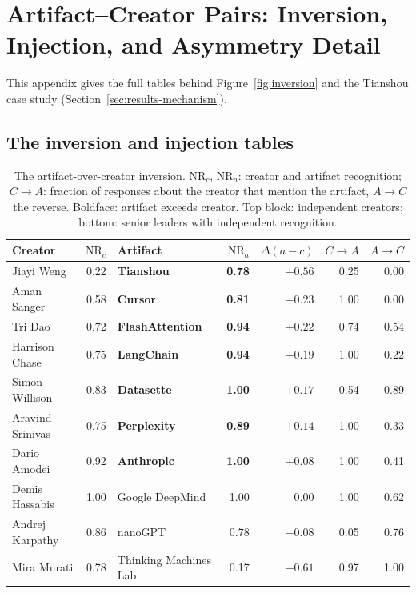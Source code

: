 \section{Artifact--Creator Pairs: Inversion, Injection, and Asymmetry Detail}
\label{app:asymmetry}

This appendix gives the full tables behind Figure~\ref{fig:inversion} and the Tianshou case study (Section~\ref{sec:results-mechanism}).

\subsection{The inversion and injection tables}

\begin{table}[!htbp]
\centering
\small
\caption{The artifact-over-creator inversion. $\mathrm{NR}_c$, $\mathrm{NR}_a$: creator and artifact recognition; $C\!\to\!A$: fraction of responses about the creator that mention the artifact, $A\!\to\!C$ the reverse. Boldface: artifact exceeds creator. Top block: independent creators; bottom: senior leaders with independent recognition.}
\label{tab:inversion}
\begin{tabular}{lrlrrrr}
\toprule
Creator & $\mathrm{NR}_c$ & Artifact & $\mathrm{NR}_a$ & $\Delta(a{-}c)$ & $C\!\to\!A$ & $A\!\to\!C$ \\
\midrule
Jiayi Weng & 0.22 & \textbf{Tianshou} & \textbf{0.78} & $\mathbf{+0.56}$ & 0.25 & 0.00 \\
Aman Sanger & 0.58 & \textbf{Cursor} & \textbf{0.81} & $\mathbf{+0.23}$ & 1.00 & 0.00 \\
Tri Dao & 0.72 & \textbf{FlashAttention} & \textbf{0.94} & $\mathbf{+0.22}$ & 0.74 & 0.54 \\
Harrison Chase & 0.75 & \textbf{LangChain} & \textbf{0.94} & $\mathbf{+0.19}$ & 1.00 & 0.22 \\
Simon Willison & 0.83 & \textbf{Datasette} & \textbf{1.00} & $\mathbf{+0.17}$ & 0.54 & 0.89 \\
Aravind Srinivas & 0.75 & \textbf{Perplexity} & \textbf{0.89} & $\mathbf{+0.14}$ & 1.00 & 0.33 \\
Dario Amodei & 0.92 & \textbf{Anthropic} & \textbf{1.00} & $\mathbf{+0.08}$ & 1.00 & 0.41 \\
\midrule
Demis Hassabis & 1.00 & Google DeepMind & 1.00 & $0.00$ & 1.00 & 0.62 \\
Andrej Karpathy & 0.86 & nanoGPT & 0.78 & $-0.08$ & 0.05 & 0.76 \\
Mira Murati & 0.78 & Thinking Machines Lab & 0.17 & $-0.61$ & 0.97 & 1.00 \\
\bottomrule
\end{tabular}
\end{table}

